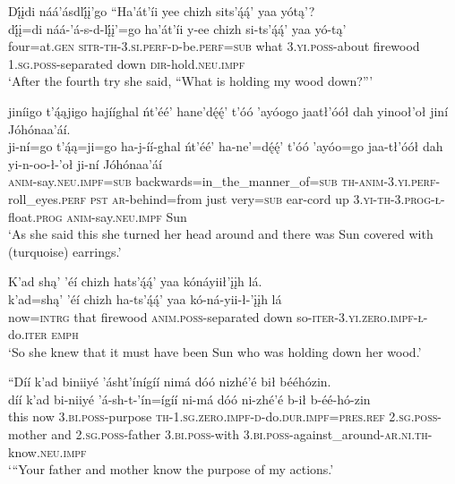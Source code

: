 \ea\label{ex:text5-7-8}
Dį́įdi náá’ásdlį́į’go ``Ha’át’íi yee chizh sits’ą́ą́’ yaa yótą’?\\
\gll dį́į=di	náá-’á-s-d-lį́į’=go	ha’át’íi	y-ee	chizh	si-ts’ą́ą́’	yaa	yó-tą’\\
     four=at.\textsc{gen}	\textsc{sitr}-\textsc{th}-3.\textsc{si}.\textsc{perf}-\textsc{d}-be.\textsc{perf}=\textsc{sub}	what	3.\textsc{yi}.\textsc{poss}-about	firewood	1.\textsc{sg}.\textsc{poss}-separated	down	\textsc{dir}-hold.\textsc{neu}.\textsc{impf}\\
\glt `After the fourth try she said, “What is holding my wood down?'''
\z

\ea\label{ex:text5-7-9}
jiníigo t’ą́ąjigo hajííghal ńt’éé’ hane’dę́ę́’ t’óó ’ayóogo jaatł’óół dah yinooł’oł jiní Jóhónaa’áí.\\
\gll ji-ní=go	t’ą́ą=ji=go	ha-j-íí-ghal	ńt’éé’	ha-ne’=dę́ę́’	t’óó	’ayóo=go	jaa-tł’óół	dah	yi-n-oo-ł-’oł	ji-ní	Jóhónaa’áí\\
     \textsc{anim}-say.\textsc{neu}.\textsc{impf}=\textsc{sub}	backwards=in\_the\_manner\_of=\textsc{sub}	\textsc{th}-\textsc{anim}-3.\textsc{yi}.\textsc{perf}-roll\_eyes.\textsc{perf}	\textsc{pst}	\textsc{ar}-behind=from	just	very=\textsc{sub}	ear-cord	up	3.\textsc{yi}-\textsc{th}-3.\textsc{prog}-\textsc{ł}-float.\textsc{prog}	\textsc{anim}-say.\textsc{neu}.\textsc{impf}	Sun\\
\glt `As she said this she turned her head around and there was Sun covered with (turquoise) earrings.'
\z

\ea\label{ex:text5-7-10}
K’ad shą’ ’éí chizh hats’ą́ą́’ yaa kónáyiił’įįh lá.\\
\gll k’ad=shą’	’éí	chizh	ha-ts’ą́ą́’	yaa	kó-ná-yii-ł-’įįh	lá\\
     now=\textsc{intrg}	that	firewood	\textsc{anim}.\textsc{poss}-separated	down	so-\textsc{iter}-3.\textsc{yi}.\textsc{zero}.\textsc{impf}-\textsc{ł}-do.\textsc{iter}	\textsc{emph}\\
\glt `So she knew that it must have been Sun who was holding down her wood.'
\z

\ea\label{ex:text5-7-11}
``Díí k’ad biniiyé ’ásht’ínígíí nimá dóó nizhé’é bił bééhózin.\\
\gll díí	k’ad	bi-niiyé	’á-sh-t-’ín=ígíí	ni-má	dóó	ni-zhé’é	b-ił	b-éé-hó-zin\\
     this	now	3.\textsc{bi}.\textsc{poss}-purpose	\textsc{th}-1.\textsc{sg}.\textsc{zero}.\textsc{impf}-\textsc{d}-do.\textsc{dur}.\textsc{impf}=\textsc{pres}.\textsc{ref}	2.\textsc{sg}.\textsc{poss}-mother	and	2.\textsc{sg}.\textsc{poss}-father	3.\textsc{bi}.\textsc{poss}-with	3.\textsc{bi}.\textsc{poss}-against\_around-\textsc{ar}.\textsc{ni}.\textsc{th}-know.\textsc{neu}.\textsc{impf}\\
\glt `“Your father and mother know the purpose of my actions.'
\z

